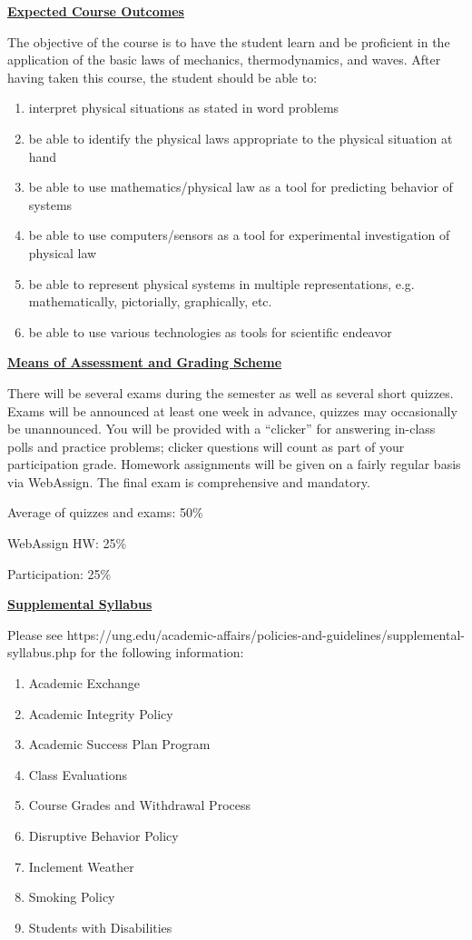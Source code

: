 \documentclass[12pt]{article}
\begin{document}
\underline{\textbf{Expected Course Outcomes}} \par
The objective of the course is to have the student learn and be proficient in the application of the basic laws of mechanics, thermodynamics, and waves.
After having taken this course, the student should be able to:
\begin{enumerate}
\item interpret physical situations as stated in word problems
\item be able to identify the physical laws appropriate to the physical situation at hand
\item be able to use mathematics/physical law as a tool for predicting behavior of systems
\item be able to use computers/sensors as a tool for experimental investigation of physical law
\item be able to represent physical systems in multiple representations, e.g. mathematically, pictorially, graphically, etc.
\item be able to use various technologies as tools for scientific endeavor
\end{enumerate}
\hfill \break

\underline{\textbf{Means of Assessment and Grading Scheme}} \par
There will be several exams during the semester as well as several short quizzes.
Exams will be announced at least one week in advance, quizzes may occasionally be unannounced.
You will be provided with a ``clicker'' for answering in-class polls and practice problems; clicker questions will count as part of your participation grade.
Homework assignments will be given on a fairly regular basis via WebAssign.
The final exam is comprehensive and mandatory. \par
\hfill \break
Average of quizzes and exams: 50\% \par
WebAssign HW: 25\% \par
Participation: 25\%
\hfill \break

\underline{\textbf{Supplemental Syllabus}} \par
Please see https://ung.edu/academic-affairs/policies-and-guidelines/supplemental-syllabus.php for the following information:
\begin{enumerate}
\item Academic Exchange
\item Academic Integrity Policy
\item Academic Success Plan Program
\item Class Evaluations
\item Course Grades and Withdrawal Process
\item Disruptive Behavior Policy
\item Inclement Weather
\item Smoking Policy
\item Students with Disabilities
\end{enumerate}
\end{document}
